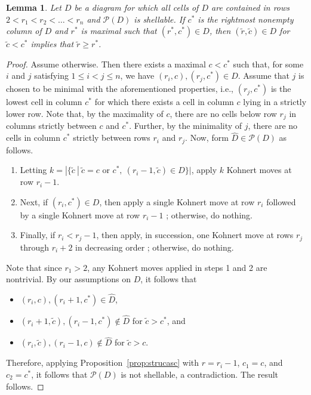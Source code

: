 \documentclass[letterpaper,10pt]{article}
\newtheorem{lemma}[theorem]{Lemma}
\newcommand{\bl}[1]{{\color{blue} #1}}
\begin{document}
\begin{lemma}\label{lem:behindblock}
    Let $D$ be a diagram for which all cells of $D$ are contained in rows $2<r_1<r_2<\hdots<r_n$ and $\mathcal{P}(D)$ is shellable. If $c^*$ is the rightmost nonempty column of $D$ and $r^*$ is maximal such that $(r^*,c^*)\in D$, then $(\tilde{r},\tilde{c})\in D$ for $\tilde{c}<c^*$ implies that $\tilde{r}\ge r^*$.
\end{lemma}
\begin{proof}
    Assume otherwise. Then there exists a maximal $c<c^*$ such that, for some $i$ and $j$ satisfying $1\leq i<j\leq n$, we have $(r_i,c),(r_j,c^*)\in D$. Assume that $j$ is chosen to be minimal with the aforementioned properties, i.e., $(r_j,c^*)$ is the lowest cell in column $c^*$ for which there exists a cell in column $c$ lying in a strictly lower row. Note that, by the maximality of $c$, there are no cells below row $r_j$ in columns strictly between $c$ and $c^*$. Further, by the minimality of $j$, there are no cells in column $c^*$ strictly between rows $r_i$ and $r_j$. Now, form $\widehat{D}\in \mathcal{P}(D)$ as follows. 
    \begin{enumerate}
        \item[1)] Letting $k=|\{\tilde{c}~|~\tilde{c}=c\text{ or }c^*,~(r_i-1,\tilde{c})\in D\}|$, apply $k$ Kohnert moves at row $r_i-1$.
        \item[2)] Next, if $(r_i,c^*)\in D$, then apply a single Kohnert move at row $r_i$ followed by a single Kohnert move at row $r_i-1$\bl{;} otherwise, do nothing.
        \item[3)] Finally, if $r_i<r_j-1$, then apply, in succession, one Kohnert move at rows $r_j$ through $r_i+2$ in decreasing order\bl{;} otherwise, do nothing.
    \end{enumerate}
    Note that since $r_1>2$, any Kohnert moves applied in steps 1 and 2 are nontrivial. By our assumptions on $D$, it follows that
    \begin{itemize}
        \item $(r_i,c),(r_i+1,c^*)\in \widehat{D}$,
        \item $(r_i+1,\tilde{c}),(r_i-1,c^*)\notin \widehat{D}$ for $\tilde{c}>c^*$, and
        \item $(r_i,\tilde{c}),(r_i-1,c)\notin\widehat{D}$ for $\tilde{c}>c$.
    \end{itemize}
    Therefore, applying Proposition~\ref{prop:strucasc} with $r=r_i-1$, $c_1=c$, and $c_2=c^*$, it follows that $\mathcal{P}(D)$ is not shellable, a contradiction. The result follows.
\end{proof}
\end{document}
